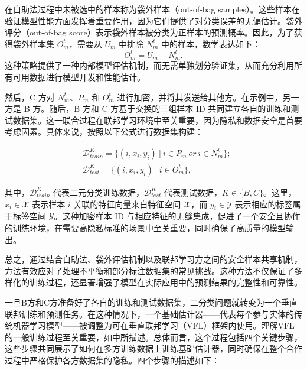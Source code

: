 在自助法过程中未被选中的样本称为袋外样本（out-of-bag samples）。这些样本在验证模型性能方面发挥着重要作用，因为它们提供了对分类误差的无偏估计。袋外评分（out-of-bag score）表示袋外样本被分类为正样本的预测概率。因此，为了获得袋外样本集 $O_{m}^{t}$，需要从 $U_{m}$ 中排除 $N_{m}^{t}$ 中的样本，数学表达如下：
\begin{equation}
	O_{m}^{t}=U_{m}-N_{m}^{t}.
\end{equation}
这种策略提供了一种内部模型评估机制，而无需单独划分验证集，从而充分利用所有可用数据进行模型开发和性能估计。

然后，C 方对 $N_{m}^{t}$、$P_{m}$ 和 $O_{m}^{t}$ 进行加密，并将其发送给其他方。在示例中，另一方是 B 方。随后，B 方和 C 方基于交换的三组样本 ID 共同建立各自的训练和测试数据集。这一联合过程在联邦学习环境中至关重要，因为隐私和数据安全是首要考虑因素。具体来说，按照以下公式进行数据集构建：

\begin{equation}
	\begin{split}
		&\mathsf{\mathcal{D}}_{train}^{K}=\{(i,x_{i},y_{i}) \ | \ i\in P_{m}\ or\ i\in N_{m}^{t}\};\\
		&\mathsf{\mathcal{D}}_{test}^{K}=\{(i,x_{i},y_{i}) \ | \ i\in O_{m}^{t}\},
	\end{split}
\end{equation}

其中，$\mathsf{\mathcal{D}}_{train}^{K}$ 代表二元分类训练数据，$\mathsf{\mathcal{D}}_{test}^{K}$ 代表测试数据，$K\in \{B,C\}$。这里，$x_{i}\in \mathsf{\mathcal{X}}$ 表示样本 $i$ 关联的特征向量来自特征空间 $\mathsf{\mathcal{X}}$，而 $y_{i}\in \mathsf{\mathcal{Y}}$ 表示相应的标签属于标签空间 $\mathsf{\mathcal{Y}}$。这种加密样本 ID 与相应特征的无缝集成，促进了一个安全且协作的训练环境，在需要高隐私标准的场景中至关重要，同时确保了高质量的模型输出。

总之，通过结合自助法、袋外评估机制以及联邦学习方之间的安全样本共享机制，方法有效应对了处理不平衡和部分标注数据集的常见挑战。这种方法不仅保证了多样化的训练过程，还显著增强了模型在实际应用中的预测结果的完整性和可靠性。

一旦B方和C方准备好了各自的训练和测试数据集，二分类问题就转变为一个垂直联邦训练和预测任务。在这种情况下，一个基础估计器——代表每个参与实体的传统机器学习模型——被调整为可在垂直联邦学习（VFL）框架内使用。理解VFL的一般训练过程至关重要，如\textsuperscript{\cite{yang2019federated}}中所描述。总体而言，这个过程包括四个关键步骤，这些步骤共同展示了如何在多方训练数据上训练基础估计器，同时确保在整个合作过程中严格保护各方数据集的隐私。四个步骤的描述如下：

